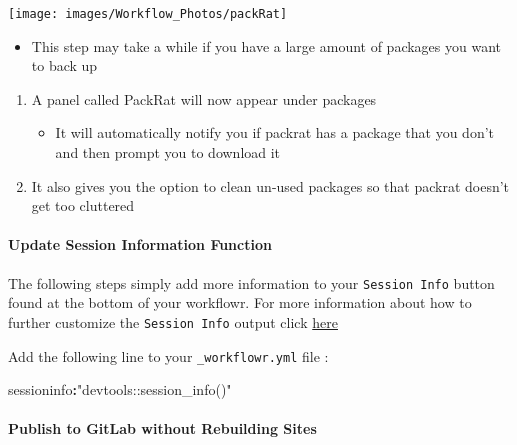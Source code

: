 \documentclass[openany]{article}
\newenvironment{Shaded}{\begin{snugshade}}{\end{snugshade}}
\newcommand{\NormalTok}[1]{#1}
\newcommand{\OperatorTok}[1]{\textcolor[rgb]{0.81,0.36,0.00}{\textbf{#1}}}
\newcommand{\StringTok}[1]{\textcolor[rgb]{0.31,0.60,0.02}{#1}}
\providecommand{\tightlist}{%
  \setlength{\itemsep}{0pt}\setlength{\parskip}{0pt}}
\let\oldparagraph\paragraph
\renewcommand{\paragraph}[1]{\oldparagraph{#1}\mbox{}}
\begin{document}
\begin{center}\texttt{[image: images/Workflow\_Photos/packRat]} \end{center}

\begin{itemize}
\tightlist
\item
  This step may take a while if you have a large amount of packages you want to back up
\end{itemize}

\begin{enumerate}
\def\labelenumi{\arabic{enumi}.}
\setcounter{enumi}{2}
\tightlist
\item
  A panel called PackRat will now appear under packages

  \begin{itemize}
  \tightlist
  \item
    It will automatically notify you if packrat has a package that you don't and then prompt you to download it
  \end{itemize}
\item
  It also gives you the option to clean un-used packages so that packrat doesn't get too cluttered
\end{enumerate}

\hypertarget{update-session-information-function-1}{%
\paragraph{Update Session Information Function}\label{update-session-information-function-1}}

The following steps simply add more information to your \texttt{Session\ Info} button found at the bottom of your workflowr. For more information about how to further customize the \texttt{Session\ Info} output click \href{https://jdblischak.github.io/workflowr/articles/wflow-02-customization.html}{here}

Add the following line to your \texttt{\_workflowr.yml} file :

\begin{Shaded}
\begin{Highlighting}[]
\NormalTok{sessioninfo}\OperatorTok{:}\StringTok{"devtools::session_info()"}
\end{Highlighting}
\end{Shaded}

\hypertarget{publish-to-gitlab-without-rebuilding-sites-1}{%
\paragraph{Publish to GitLab without Rebuilding Sites}\label{publish-to-gitlab-without-rebuilding-sites-1}}
\end{document}
